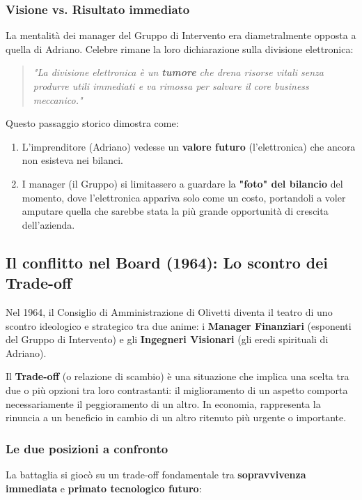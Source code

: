 \documentclass[a4paper,12pt]{article}
\begin{document}
	\subsubsection{Visione vs. Risultato immediato}
	La mentalità dei manager del Gruppo di Intervento era diametralmente opposta a quella di Adriano. Celebre rimane la loro dichiarazione sulla divisione elettronica:
	
	\begin{quote}
		\textit{"La divisione elettronica è un \textbf{tumore} che drena risorse vitali senza produrre utili immediati e va rimossa per salvare il core business meccanico."}
	\end{quote}
	
	Questo passaggio storico dimostra come:
	\begin{enumerate}
		\item L'imprenditore (Adriano) vedesse un \textbf{valore futuro} (l'elettronica) che ancora non esisteva nei bilanci.
		\item I manager (il Gruppo) si limitassero a guardare la \textbf{"foto" del bilancio} del momento, dove l'elettronica appariva solo come un costo, portandoli a voler amputare quella che sarebbe stata la più grande opportunità di crescita dell'azienda.
	\end{enumerate}
	
	\subsection{Il conflitto nel Board (1964): Lo scontro dei Trade-off}
	Nel 1964, il Consiglio di Amministrazione di Olivetti diventa il teatro di uno scontro ideologico e strategico tra due anime: i \textbf{Manager Finanziari} (esponenti del Gruppo di Intervento) e gli \textbf{Ingegneri Visionari} (gli eredi spirituali di Adriano).
	
	\begin{tcolorbox}[colback=red!5,colframe=red!75!black,title=Definizione di Trade-off]
		Il \textbf{Trade-off} (o relazione di scambio) è una situazione che implica una scelta tra due o più opzioni tra loro contrastanti: il miglioramento di un aspetto comporta necessariamente il peggioramento di un altro. In economia, rappresenta la rinuncia a un beneficio in cambio di un altro ritenuto più urgente o importante.
	\end{tcolorbox}
	
	\subsubsection{Le due posizioni a confronto}
	La battaglia si giocò su un trade-off fondamentale tra \textbf{sopravvivenza immediata} e \textbf{primato tecnologico futuro}:
	
\end{document}
